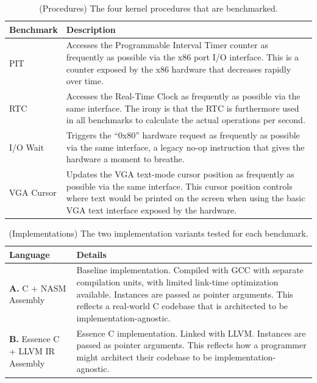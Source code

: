 \documentclass[12pt,a4paper,twoside]{report}
\begin{document}
\begin{table}[H]
\centering
\begin{tabular}{|l|p{10cm}|}
\hline
\textbf{Benchmark} & \textbf{Description} \\
\hline
PIT & Accesses the Programmable Interval Timer counter as frequently as possible via the x86 port I/O interface. This is a counter exposed by the x86 hardware that decreases rapidly over time. \\
\hline
RTC & Accesses the Real-Time Clock as frequently as possible via the same interface. The irony is that the RTC is furthermore used in all benchmarks to calculate the actual operations per second. \\
\hline
I/O Wait & Triggers the ``0x80'' hardware request as frequently as possible via the same interface, a legacy no-op instruction that gives the hardware a moment to breathe. \\
\hline
VGA Cursor & Updates the VGA text-mode cursor position as frequently as possible via the same interface. This cursor position controls where text would be printed on the screen when using the basic VGA text interface exposed by the hardware. \\
\hline
\end{tabular}
\caption{(Procedures) The four kernel procedures that are benchmarked.}
\label{tab:benchmarks}
\end{table}

\begin{table}[H]
\centering
\begin{tabular}{|p{4.75cm}|p{10cm}|}
\hline
\textbf{Language} & \textbf{Details} \\
\hline
\textbf{A.} C + NASM Assembly & Baseline implementation. Compiled with GCC with separate compilation units, with limited link-time optimization available. Instances are passed as pointer arguments. This reflects a real-world C codebase that is architected to be implementation-agnostic. \\
\hline
\textbf{B.} Essence C + LLVM IR Assembly & Essence C implementation. Linked with LLVM. Instances are passed as pointer arguments. This reflects how a programmer might architect their codebase to be implementation-agnostic. \\

\hline
\end{tabular}
\caption{(Implementations) The two implementation variants tested for each benchmark.}
\label{tab:implementations}
\end{table}
\end{document}
